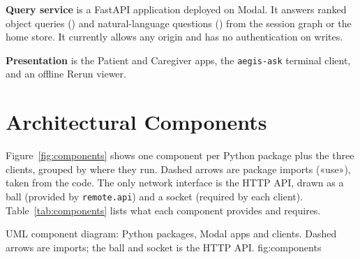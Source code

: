 \textbf{Query service} is a FastAPI application deployed on Modal. It answers
ranked object queries () and natural-language questions
() from the session graph or the home store. It currently allows
any origin and has no authentication on writes.

\textbf{Presentation} is the Patient and Caregiver apps, the \texttt{aegis-ask}
terminal client, and an offline Rerun viewer.

\section{Architectural Components}
\label{sec:components}
Figure~\ref{fig:components} shows one component per Python package plus the
three clients, grouped by where they run. Dashed arrows are package imports
(«use»), taken from the code. The only network interface is the HTTP API,
drawn as a ball (provided by \texttt{remote.api}) and a socket (required by
each client). Table~\ref{tab:components} lists what each component provides and
requires.

  {UML component diagram: Python packages, Modal apps and clients. Dashed
   arrows are imports; the ball and socket is the HTTP API.}
  {fig:components}

